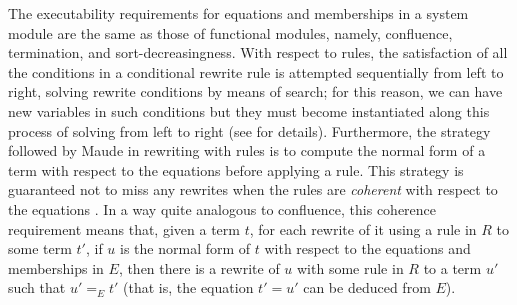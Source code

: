 The executability requirements for equations and memberships in a system module are the
same as those of functional modules, namely, confluence, termination, and sort-decreasingness. 
With respect to rules, the satisfaction of all the conditions in a conditional rewrite rule is 
attempted sequentially from left to right, solving rewrite conditions by means of search; 
for this reason, we can have new variables in such conditions but they must become instantiated
along this process of solving from left to right (see \cite{maude-book} for details). 
Furthermore, the strategy followed by Maude in rewriting with rules is to compute the
normal form of a term with respect to the equations before applying a rule. This strategy 
is guaranteed not to miss any rewrites when the rules are \emph{coherent} with respect to the
equations \cite{eq-rl-rwl,maude-book}.  In a way quite analogous to confluence, this coherence 
requirement means that, given a term $t$, for each rewrite of it using a rule in $R$ to some 
term $t'$, if $u$ is the normal form of $t$ with respect to the equations and memberships in $E$, 
then there is a rewrite of $u$ with some rule in $R$ to a term $u'$ such that $u' =_E t'$
(that is, the equation $t' = u'$ can be deduced from $E$).






















